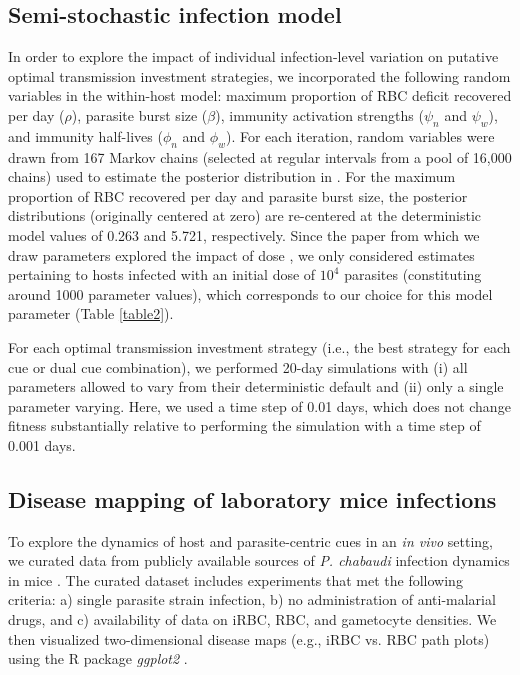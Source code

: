 \documentclass[10pt,letterpaper]{article}
\begin{document}
\subsection*{Semi-stochastic infection model}
In order to explore the impact of individual infection-level variation on putative optimal transmission investment strategies, we incorporated the following random variables in the within-host model: maximum proportion of RBC deficit recovered per day ($\rho$), parasite burst size ($\beta$), immunity activation strengths ($\psi_{n}$ and $\psi_{w}$), and immunity half-lives ($\phi_{n}$ and $\phi_{w}$). For each iteration, random variables were drawn from 167 Markov chains (selected at regular intervals from a pool of 16,000 chains) used to estimate the posterior distribution in \cite{kamiya_uncovering_2020}. For the maximum proportion of RBC recovered per day and parasite burst size, the posterior distributions (originally centered at zero) are re-centered at the deterministic model values of 0.263 and 5.721, respectively. Since the paper from which we draw parameters explored the impact of dose \cite{kamiya_uncovering_2020}, we only considered estimates pertaining to hosts infected with an initial dose of $10^4$ parasites (constituting around 1000 parameter values), which corresponds to our choice for this model parameter (Table \ref{table2}). \newline

For each optimal transmission investment strategy (i.e., the best strategy for each cue or dual cue combination), we performed 20-day simulations with (i) all parameters allowed to vary from their deterministic default and (ii) only a single parameter varying. Here, we used a time step of 0.01 days, which does not change fitness substantially relative to performing the simulation with a time step of 0.001 days. 

\subsection*{Disease mapping of laboratory mice infections}
To explore the dynamics of host and parasite-centric cues in an \emph{in vivo} setting, we curated data from publicly available sources of \emph{P. chabaudi} infection dynamics in mice \cite{huijben_data_2011, huijben_data_2013, huijben_data_2014, huijben_data_2018, pollitt_competition_2011,reece_sex_2008}. The curated dataset includes experiments that met the following criteria: a) single parasite strain infection, b) no administration of anti-malarial drugs, and c) availability of data on iRBC, RBC, and gametocyte densities. We then visualized two-dimensional disease maps (e.g., iRBC vs. RBC path plots) using the R package \emph{ggplot2} \cite{wickham_ggplot2_2016}.
\end{document}

